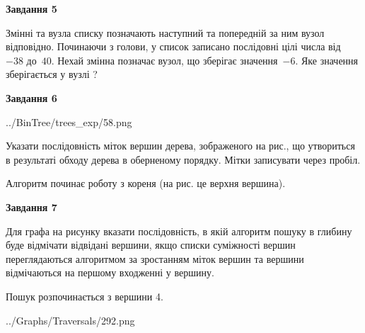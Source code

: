 \documentclass[12pt, ukrainian]{article}
\begin{document}
{\begin {large}
{\begin {center}\textbf{Завдання 5}\end {center}}\par
Змінні  та  вузла списку позначають наступний та попередній за ним вузол відповідно. Починаючи з голови, у список записано послідовні цілі числа від~$-38$ до~$40$. Нехай змінна  позначає вузол, що зберігає значення~$-6$.
Яке значення зберігається у вузлі  ?\par
\newpage

{\begin {center}\textbf{Завдання 6}\end {center}}\par

\begin{center}
	{../BinTree/trees_exp/58.png}
\end{center}
Указати послідовність міток вершин дерева, зображеного на рис., що утвориться в результаті обходу дерева в оберненому порядку. Мітки записувати через пробіл.\par Алгоритм починає роботу з кореня (на рис. це верхня вершина).\par
\newpage

{\begin {center}\textbf{Завдання 7}\end {center}}\par
Для графа на рисунку вказати послідовність, в якій алгоритм пошуку в глибину буде відмічати відвідані вершини, якщо списки суміжності вершин переглядаються алгоритмом за зростанням міток вершин та вершини відмічаються на першому вход\-женні у вершину.\par
Пошук розпочинається з вершини 4.\par

\begin{center}
	{../Graphs/Traversals/292.png}
\end{center}\par
\newpage


\end{large}}
\end{document}
